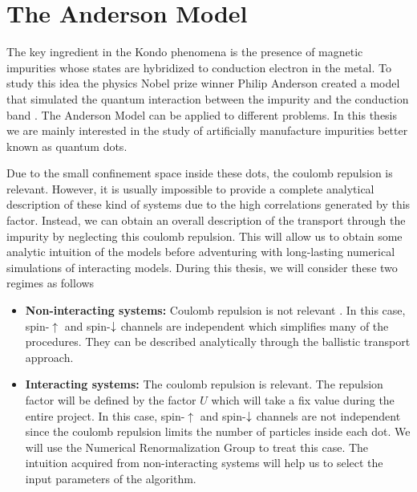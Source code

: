 





\section{The Anderson Model}
The key ingredient in the Kondo phenomena is the presence of magnetic impurities whose states are hybridized to conduction electron in the metal. To study this idea the physics Nobel prize winner Philip Anderson created a model that simulated the quantum interaction between the impurity and the conduction band \citep{anderson_localized_1961}. The Anderson Model can be applied to different problems. In this thesis we are mainly interested in the study of artificially manufacture impurities better known as quantum dots.   

 
 Due to the small confinement space inside these dots, the coulomb repulsion is relevant. However, it is usually impossible to provide a complete analytical description of these kind of systems due to the high correlations generated by this factor. Instead, we can obtain an overall description of the transport through the impurity by neglecting this coulomb repulsion. This will allow us to obtain some analytic intuition of the models  before adventuring with long-lasting numerical simulations of interacting models. During this thesis, we will consider these two regimes as follows
\begin{itemize}
    \item \textbf{Non-interacting systems:} Coulomb repulsion is not relevant . In this case, spin-$\uparrow$ and spin-$\downarrow$ channels are independent which simplifies many of the procedures. They can be described analytically through the ballistic transport approach. 

    \item \textbf{Interacting systems:} The coulomb repulsion is relevant. The repulsion factor will be defined by the factor $U$ which will take a fix value during the entire project. In this case, spin-$\uparrow$ and spin-$\downarrow$ channels are not independent since the coulomb repulsion limits the number of particles inside each dot. We will use the Numerical Renormalization Group to treat this case. The intuition acquired from non-interacting systems will help us to select the input parameters of the algorithm.  
\end{itemize}


